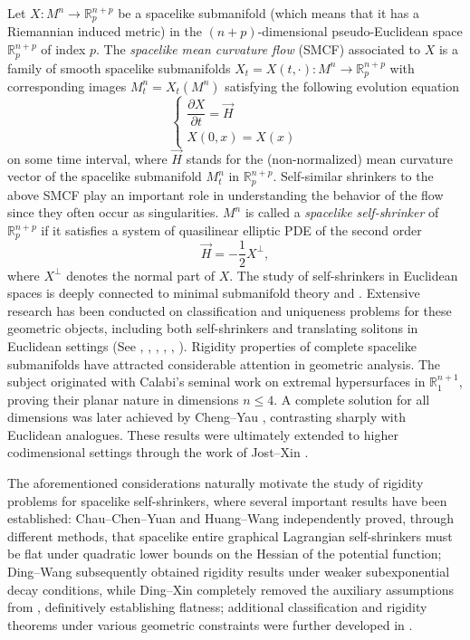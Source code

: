 \documentclass[leqno,11pt]{amsart}
\theoremstyle{plain}
\theoremstyle{definition}
\numberwithin{equation}{section}
\begin{document}
Let $X:M^n\rightarrow\mathbb R_p^{n+p}$ be a spacelike submanifold (which means that it has a Riemannian induced metric) in the $(n+p)$-dimensional pseudo-Euclidean space $\mathbb R^{n+p}_p$ of index $p$. The {\em spacelike mean curvature flow} (SMCF) associated to $X$ is a family of smooth spacelike submanifolds $X_t=X(t,\cdot):M^n\rightarrow\mathbb R_p^{n+p}$ with corresponding images $M^n_t=X_t(M^n)$ satisfying the following evolution equation
\begin{equation*}\label{eq-int:1}
	\left\{\begin{array}{l}\dfrac{\partial X}{\partial t}=\vec{H}\\ X(0,x)=X(x)
	\end{array}\right.
\end{equation*}
on some time interval, where $\vec{H}$ stands for the (non-normalized) mean curvature vector of the spacelike submanifold $M^n_t$ in $\mathbb R_p^{n+p}$. Self-similar shrinkers to the above SMCF play an important role in understanding the behavior of the flow since they often occur as singularities. $M^n$ is called a {\em spacelike self-shrinker} of $\mathbb{R}^{n+p}_{p}$ if it satisfies a system of quasilinear elliptic PDE of the second order
\begin{equation}\label{self}
	\vec{H}=-\frac{1}{2}X^{\perp},
\end{equation}
where $X^\perp$ denotes the normal part of $X$. The study of self-shrinkers in Euclidean spaces is deeply connected to minimal submanifold theory \cite{Angenent1992} and \cite{ColdingMinicozzi2012}. Extensive research has been conducted on classification and uniqueness problems for these geometric objects, including both self-shrinkers and translating solitons in Euclidean settings (See \cite{AbreschLanger1986}, \cite{CaoLi2013}, \cite{Wang2011}, \cite{Wang2011b}, \cite{NevesTian2013}, \cite{Qiu:2021}). Rigidity properties of complete spacelike submanifolds have attracted considerable attention in geometric analysis. The subject originated with Calabi's \cite{Calabi1968} seminal work on extremal hypersurfaces in $\mathbb{R}^{n+1}_1$, proving their planar nature in dimensions $n \leq 4$. A complete solution for all dimensions was later achieved by Cheng--Yau \cite{ChengYau1976}, contrasting sharply with Euclidean analogues. These results were ultimately extended to higher codimensional settings through the work of Jost--Xin \cite{JostXin2001}. 

The aforementioned considerations naturally motivate the study of rigidity problems for spacelike self-shrinkers, where several important results have been established: Chau--Chen--Yuan \cite{ChengYau1976} and Huang--Wang \cite{HuangWang2011} independently proved, through different methods, that spacelike entire graphical Lagrangian self-shrinkers must be flat under quadratic lower bounds on the Hessian of the potential function; Ding--Wang \cite{Ding-Wang:2010} subsequently obtained rigidity results under weaker subexponential decay conditions, while Ding--Xin \cite{DingXin2014} completely removed the auxiliary assumptions from \cite{ChauChenYuan2012,HuangWang2011}, definitively establishing flatness; additional classification and rigidity theorems under various geometric constraints were further developed in \cite{Adames2014,Liu-Xin:2016}.
\end{document}
